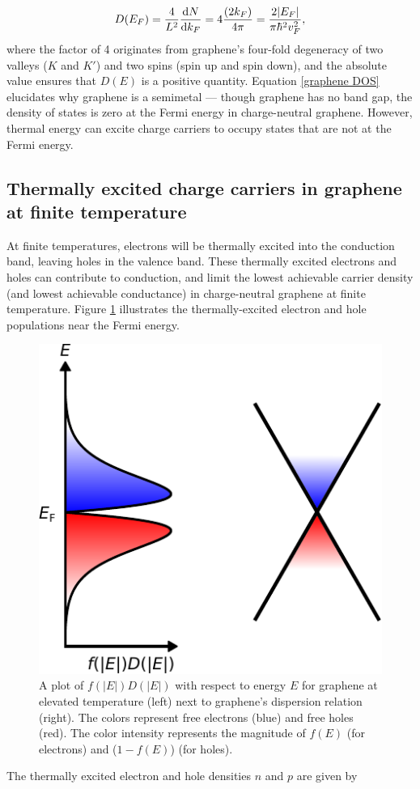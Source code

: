 \documentclass[double,12pt,1in,seploa]{beavtex}
\let\Oldsubsection\subsection
\renewcommand{\subsection}{\FloatBarrier\Oldsubsection}
\begin{document}
\begin{equation}
    D(E_F) = \frac{4}{L^2} \derivative{N}{k_F} = 4\frac{(2k_F)}{4 \pi} = \frac{2\abs{E_F}}{\pi \hbar^2 v_F^2}, \label{graphene DOS}
\end{equation}
where the factor of 4 originates from graphene's four-fold degeneracy of two valleys ($K$ and $K'$) and two spins (spin up and spin down), and the absolute value ensures that $D(E)$ is a positive quantity. Equation \ref{graphene DOS} elucidates why graphene is a semimetal — though graphene has no band gap, the density of states is zero at the Fermi energy in charge-neutral graphene. However, thermal energy can excite charge carriers to occupy states that are not at the Fermi energy.

\subsection{Thermally excited charge carriers in graphene at finite temperature}
At finite temperatures, electrons will be thermally excited into the conduction band, leaving holes in the valence band. These thermally excited electrons and holes can contribute to conduction, and limit the lowest achievable carrier density (and lowest achievable conductance) in charge-neutral graphene at finite temperature. Figure \ref{graphene at elevated T plot} illustrates the thermally-excited electron and hole populations near the Fermi energy. 
\begin{figure}
    \includegraphics{graphene theory 3.pdf}
    \caption{A plot of $f(|E|)D(|E|)$ with respect to energy $E$ for graphene at elevated temperature (left) next to graphene's dispersion relation (right). The colors represent free electrons (blue) and free holes (red). The color intensity represents the magnitude of $f(E)$ (for electrons) and ($1-f(E)$) (for holes).}
    \label{graphene at elevated T plot}
\end{figure}
The thermally excited electron and hole densities $n$ and $p$ are given by
\end{document}
